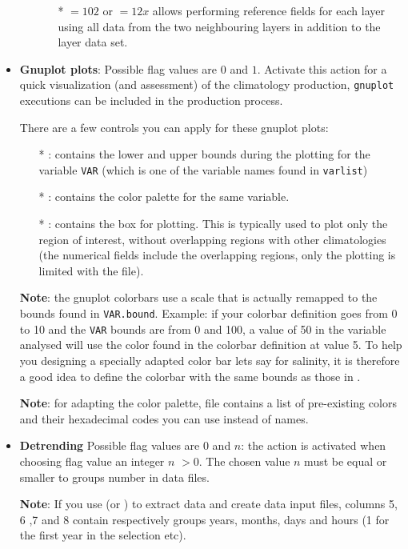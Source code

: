 \begin{itemize}
\begin{itemize}
\begin{itemize}
               \item[*] $=102$ or $=12x$ allows performing reference fields for each layer using all data from the two neighbouring layers in addition to the layer data set.
              \end{itemize}
   \end{itemize}
\item {\bf Gnuplot plots}: Possible flag values are $0$ and $1$. Activate this action for a quick visualization (and assessment) of the climatology production, {\tt gnuplot} executions can be included in the production process.\par 
There are a few controls you can apply for these gnuplot plots:
\begin{itemize}
\item[*] : contains the lower and upper bounds during the plotting for the variable {\tt VAR} (which is one of the variable names found in {\tt varlist}) 
\item[*] : contains the color palette for the same variable.
\item[*] : contains the box for plotting. This is typically used to plot only the region of interest, without overlapping regions with other climatologies (the numerical fields include the overlapping regions, only the plotting is limited with the  file).
\end{itemize}
{\bf Note}: the gnuplot colorbars use a scale that is actually remapped to the bounds found in {\tt VAR.bound}. Example:
if your colorbar definition goes from 0 to 10 and the {\tt VAR} bounds are from 0 and 100, a value of 50 in the variable analysed will use the color found in the colorbar definition at value 5. To help you designing a specially adapted color bar lets say for salinity, it is therefore a good idea to define the colorbar with the same bounds as those in .

{\bf Note}: for adapting the color palette, file  contains a list of pre-existing colors and their hexadecimal codes you can use instead of names.

\item {\bf Detrending} Possible flag values are $0$ and $n$: the action is activated when choosing flag value an integer $n$ $>0$. The chosen value $n$ must be equal or smaller to groups number in data files.\par
{\bf Note}: If you use  (or ) to extract data and create data input files, columns 5, 6 ,7 and 8 contain respectively groups years, months, days and hours (1 for the first year in the selection etc).
\end{itemize}

